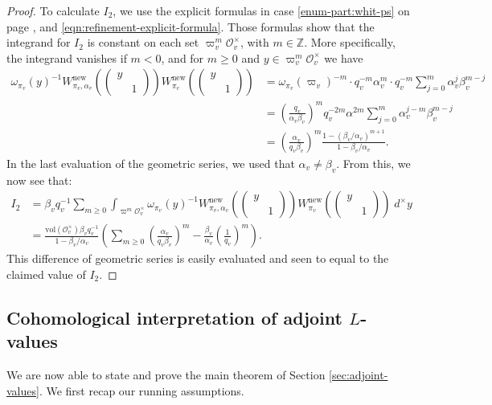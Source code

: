 \documentclass[10pt, twoside]{amsart}
\theoremstyle{plain}
\theoremstyle{definition}
\theoremstyle{remark}
\numberwithin{equation}{subsection}
\def\Z{\mathbb Z}
\def\new{\mathrm{new}}
\def\scro{\mathscr O}
\def\scro{\mathscr O}
\begin{document}
\begin{proof}
To calculate $I_2$, we use the explicit formulas in case \ref{enum-part:whit-ps} on page \pageref{enum-part:whit-ps}, and \eqref{eqn:refinement-explicit-formula}. Those formulas show that the integrand for $I_2$ is constant on each set $\varpi_v^m\scro_v^\times$, with $m \in \Z$. More specifically, the integrand vanishes if $m < 0$, and for $m \geq 0$ and $y \in \varpi_v^m\scro_v^\times$ we have
\begin{align*}
\omega_{\pi_v}(y)^{-1}W_{\pi_v,\alpha_v}^{\new}\left(\begin{pmatrix} y \\ & 1 \end{pmatrix}\right)W_{\pi_v}^{\new}\left(\begin{pmatrix} y \\ & 1 \end{pmatrix}\right) &= \omega_{\pi_v}(\varpi_v)^{-m} \cdot q_v^{-m}\alpha_v^m \cdot q_v^{-m} \sum_{j=0}^m \alpha_v^j \beta_v^{m-j}\\
&= \left(\frac{q_v}{\alpha_v\beta_v}\right)^m q_v^{-2m}\alpha^{2m} \sum_{j=0}^{m} \alpha_v^{j-m}\beta_v^{m-j}\\
&= \left(\frac{\alpha_v}{q_v\beta_v}\right)^m \frac{1 - (\beta_v/\alpha_v)^{m+1}}{1-\beta_v/\alpha_v}.
\end{align*}
In the last evaluation of the geometric series, we used that $\alpha_v \neq \beta_v$.
From this, we now see that:
\begin{align*}
I_2 &=  \beta_v q_v^{-1} \sum_{m \geq 0} \int_{\varpi^m \scro_v^\times} \omega_{\pi_v}(y)^{-1}W_{\pi_v,\alpha_v}^{\new}\left(\begin{pmatrix} y \\ & 1 \end{pmatrix}\right)W_{\pi_v}^{\new}\left(\begin{pmatrix} y \\ & 1 \end{pmatrix}\right)\; d^\times y\\
&= \frac{\mathrm{vol}(\scro_v^\times)\beta_v q_v^{-1}}{1-\beta_v/\alpha_v} \left(\sum_{m \geq 0} \left(\frac{\alpha_v}{q_v\beta_v}\right)^m  - \frac{\beta_v}{\alpha_v} \left(\frac{1}{q_v}\right)^m \right).
\end{align*}
This difference of geometric series is easily evaluated and seen to equal to the claimed value of $I_2$.
\end{proof}

\subsection{Cohomological interpretation of adjoint $L$-values}\label{subsec:cohom-interpret}
We are now able to state and prove the main theorem of Section \ref{sec:adjoint-values}. We first recap our running assumptions.
\end{document}
